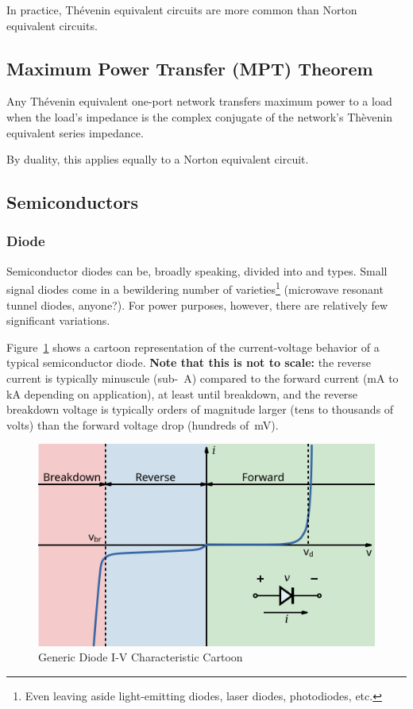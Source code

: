 \documentclass[11pt]{article}
\newlength\onenarrow
\begin{document}
In practice, Th\'evenin equivalent circuits are more common than
Norton equivalent circuits.


\subsection{Maximum Power Transfer (MPT) Theorem}

Any Th\'evenin equivalent one-port network transfers maximum power to
a load when the load's impedance is the complex conjugate of the
network's Th\`evenin equivalent series impedance.

By duality, this applies equally to a Norton equivalent circuit.


\subsection{Semiconductors}

\subsubsection{Diode}

Semiconductor diodes can be, broadly speaking, divided into
 and  types. Small signal diodes come
in a bewildering number of varieties\footnote{Even leaving aside
  light-emitting diodes, laser diodes, photodiodes, etc.} (microwave
resonant tunnel diodes, anyone?). For power purposes, however, there
are relatively few significant variations.

Figure~\ref{fig:ivdiode} shows a cartoon representation of the
current-voltage behavior of a typical semiconductor diode. {\bf Note
  that this is not to scale: }the reverse current is typically
minuscule (sub-\unit{\mu A}) compared to the forward current
(\unit{mA} to \unit{kA} depending on application), at least until
breakdown, and the reverse breakdown voltage is typically orders of
magnitude larger (tens to thousands of volts) than the forward voltage
drop (hundreds of~\unit{mV}).

\begin{figure}
  \centering
  \includegraphics[width=\onenarrow]{ivdiode}
  \caption{Generic Diode I-V Characteristic Cartoon}
  \label{fig:ivdiode}
\end{figure}
\end{document}
